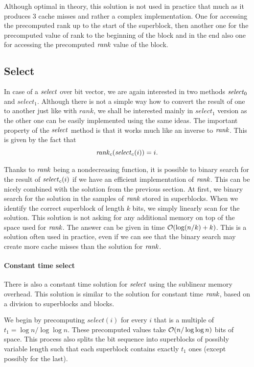 Although optimal in theory, this solution is not used in practice that much as it produces
3 cache misses and rather a complex implementation. One for accessing the precomputed rank up
to the start of the superblock, then another one for the precomputed value of rank to the
beginning of the block and in the end also one for accessing the precomputed $\mathit{rank}$ value
of the block.


\subsection{Select}
\label{section:select}

In case of a $\mathit{select}$ over bit vector, we are again interested in two methods $\mathit{select}_0$
and $select_1$. Although there is not a simple way how to convert the result of one to
another just like with $rank$, we shall be interested mainly in $select_1$ version as the
other one can be easily implemented using the same ideas. The important property of the
$\mathit{select}$ method is that it works much like an inverse to $\mathit{rank}$. This is given by the fact that
$$\mathit{rank}_c(\mathit{select}_c(i)) = i.$$

Thanks to $\mathit{rank}$ being a nondecreasing function, it is possible
to binary search for the result of $\mathit{select}_c(i)$ if we have an efficient implementation of
$\mathit{rank}$. This can be nicely combined with the solution from the previous section.
At first, we binary search for the solution in the samples of $\mathit{rank}$ stored in superblocks. When we
identify the correct superblock of length $k$ bits, we simply linearly scan for the solution. This
solution is not asking for any additional memory on top of the space used for $\mathit{rank}$. The answer
can be given in time $\mathcal{O}(\log(n/k)+k)$. This is a solution often used in practice, even if we
can see that the binary search may create more cache misses than the solution for $\mathit{rank}$.

\paragraph{Constant time select}

There is also a constant time solution for $\mathit{select}$ using the sublinear memory overhead.
This solution is similar to the solution for constant time $\mathit{rank}$, based on a division to
superblocks and blocks.

We begin by precomputing $select(i)$ for every $i$ that is a
multiple of $t_1=\log n/\log\log n$. These precomputed values take $\mathcal{O}(n/\log\log n)$ bits of space.
This process also splits the bit sequence into superblocks of possibly variable length such that
each superblock contains exactly $t_1$ ones (except possibly for the last).

